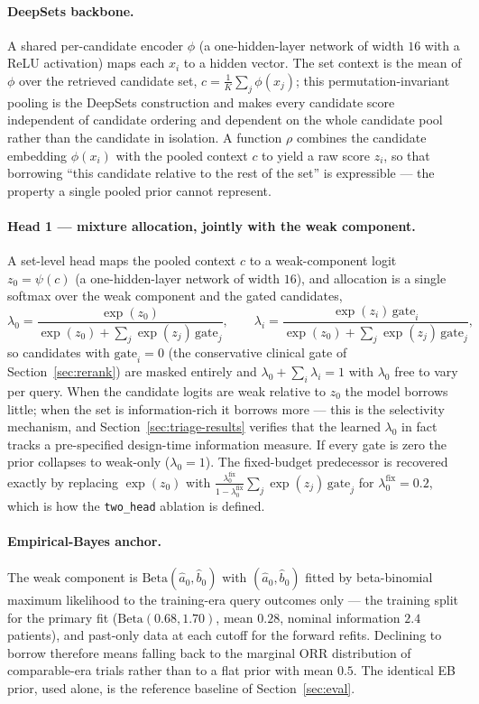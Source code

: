 \documentclass[11pt]{article}
\newcommand{\lamz}{\lambda_{0}}
\begin{document}
\paragraph{DeepSets backbone.} A shared per-candidate encoder $\phi$ (a
one-hidden-layer network of width $16$ with a ReLU activation) maps each $x_i$
to a hidden vector. The set context is the mean of $\phi$ over the retrieved
candidate set, $c = \tfrac{1}{K}\sum_j \phi(x_j)$; this permutation-invariant
pooling is the DeepSets construction and makes every candidate score
independent of candidate ordering and dependent on the whole candidate pool
rather than the candidate in isolation. A function $\rho$ combines the
candidate embedding $\phi(x_i)$ with the pooled context $c$ to yield a raw score
$z_i$, so that borrowing ``this candidate relative to the rest of the set'' is
expressible --- the property a single pooled prior cannot represent.

\paragraph{Head 1 --- mixture allocation, jointly with the weak component.}
A set-level head maps the pooled context $c$ to a weak-component logit
$z_0 = \psi(c)$ (a one-hidden-layer network of width $16$), and allocation is
a single softmax over the weak component and the gated candidates,
\begin{equation}
\lamz = \frac{\exp(z_0)}{\exp(z_0) + \sum_j \exp(z_j)\,\mathrm{gate}_j},
\qquad
\lambda_i = \frac{\exp(z_i)\,\mathrm{gate}_i}{\exp(z_0) + \sum_j \exp(z_j)\,\mathrm{gate}_j},
\end{equation}
so candidates with $\mathrm{gate}_i = 0$ (the conservative clinical gate of
Section~\ref{sec:rerank}) are masked entirely and
$\lamz + \sum_i \lambda_i = 1$ with $\lamz$ free to vary per query. When the
candidate logits are weak relative to $z_0$ the model borrows little; when the
set is information-rich it borrows more --- this is the selectivity mechanism,
and Section~\ref{sec:triage-results} verifies that the learned $\lamz$ in fact
tracks a pre-specified design-time information measure. If every gate is zero
the prior collapses to weak-only ($\lamz = 1$). The fixed-budget predecessor
is recovered exactly by replacing $\exp(z_0)$ with
$\tfrac{\lamz^{\mathrm{fix}}}{1-\lamz^{\mathrm{fix}}}\sum_j \exp(z_j)\,\mathrm{gate}_j$
for $\lamz^{\mathrm{fix}} = 0.2$, which is how the \texttt{two\_head} ablation
is defined.

\paragraph{Empirical-Bayes anchor.} The weak component is
$\mathrm{Beta}(\hat a_0, \hat b_0)$ with $(\hat a_0, \hat b_0)$ fitted by
beta-binomial maximum likelihood to the training-era query outcomes only ---
the training split for the primary fit ($\mathrm{Beta}(0.68, 1.70)$, mean
$0.28$, nominal information $2.4$ patients), and past-only data at each cutoff
for the forward refits. Declining to borrow therefore means falling back to
the marginal ORR distribution of comparable-era trials rather than to a flat
prior with mean $0.5$. The identical EB prior, used alone, is the reference
baseline of Section~\ref{sec:eval}.
\end{document}
